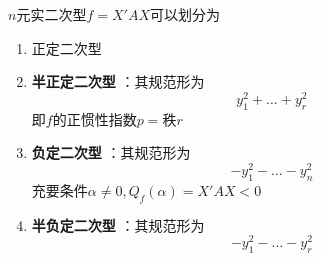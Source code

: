 \documentclass[11pt]{article}
\begin{document}
\(n\)元实二次型\(f=X'AX\)可以划分为
\begin{enumerate}
\item 正定二次型
\item \textbf{半正定二次型} ：其规范形为
\begin{equation*}
y_1^2+\dots+y_r^2
\end{equation*}
即\(f\)的正惯性指数\(p=\)秩\(r\)
\item \textbf{负定二次型} ：其规范形为
\begin{equation*}
-y_1^2-\dots-y_n^2
\end{equation*}
充要条件\(\alpha\neq0,Q_f(\alpha)=X'AX<0\)
\item \textbf{半负定二次型} ：其规范形为
\begin{equation*}
-y_1^2-\dots-y_r^2
\end{equation*}
\end{enumerate}
\end{document}
